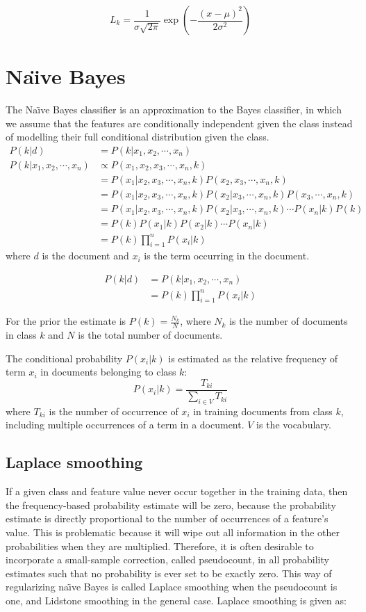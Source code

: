 \documentclass{article}
\begin{document}
\[
L_k = \frac{1}{\sigma\sqrt{2\pi}} \exp \left( -\frac{(x-\mu)^2}{2\sigma^2} \right)
\]

\section{Na\"{\i}ve Bayes}
The Na\"{\i}ve Bayes classifier is an approximation to the Bayes classifier, in which we assume that the features are conditionally independent given the class instead of modelling their full conditional distribution given the class.
\begin{align*} 
P(k|d) &= P(k|x_1,x_2,\cdots,x_n) \\
P(k|x_1,x_2,\cdots,x_n) &\propto  P(x_1,x_2,x_3,\cdots,x_n,k) \\ 
&=  P(x_1|x_2,x_3,\cdots,x_n,k)P(x_2,x_3,\cdots,x_n,k) \\ 
&= P(x_1|x_2,x_3,\cdots,x_n,k)P(x_2|x_3,\cdots,x_n,k)P(x_3,\cdots,x_n,k) \\
&=  P(x_1|x_2,x_3,\cdots,x_n,k)P(x_2|x_3,\cdots,x_n,k) \cdots P(x_n|k)P(k) \\ 
&=  P(k)P(x_1|k)P(x_2|k) \cdots P(x_n|k) \\
&=  P(k)\prod_{i=1}^{n} P(x_i|k)
\end{align*}
where $d$ is the document and $x_i$ is the term occurring in the document.

\begin{align*} 
P(k|d) &= P(k|x_1,x_2,\cdots,x_n) \\
 &= P(k)\prod_{i=1}^{n} P(x_i|k)
\end{align*}

For the prior the estimate is $P(k) = \frac{N_k}{N}$, where $N_k$ is the number of documents in class $k$ and $N$ is the total number of documents. 

The conditional probability $P(x_i|k)$ is estimated as the relative frequency of term $x_i$ in documents belonging to class $k$:
\[P(x_i|k) = \frac{T_{ki}}{\sum_{i \in V} T_{ki}}\]
where $T_{ki}$ is the number of occurrence of $x_i$ in training documents from class $k$, including multiple occurrences of a term in a document. $V$ is the vocabulary. 

\subsection{Laplace smoothing}
If a given class and feature value never occur together in the training data, then the frequency-based probability estimate will be zero, because the probability estimate is directly proportional to the number of occurrences of a feature's value. This is problematic because it will wipe out all information in the other probabilities when they are multiplied. Therefore, it is often desirable to incorporate a small-sample correction, called pseudocount, in all probability estimates such that no probability is ever set to be exactly zero. This way of regularizing na\"{\i}ve Bayes is called Laplace smoothing when the pseudocount is one, and Lidstone smoothing in the general case. Laplace smoothing is given as:
\end{document}
